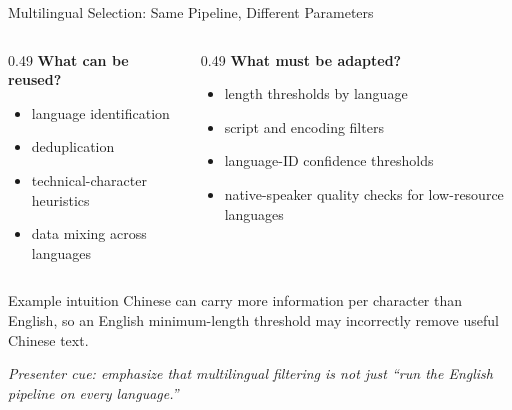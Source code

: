 \documentclass[aspectratio=169]{beamer}
\begin{document}
\begin{frame}{Multilingual Selection: Same Pipeline, Different Parameters}

\begin{columns}[T,totalwidth=\textwidth]

\begin{column}{0.49\textwidth}
\textbf{What can be reused?}
\begin{itemize}
  \item language identification
  \item deduplication
  \item technical-character heuristics
  \item data mixing across languages
\end{itemize}
\end{column}

\begin{column}{0.49\textwidth}
\textbf{What must be adapted?}
\begin{itemize}
  \item length thresholds by language
  \item script and encoding filters
  \item language-ID confidence thresholds
  \item native-speaker quality checks for low-resource languages
\end{itemize}
\end{column}

\end{columns}

\vspace{0.8em}

\begin{block}{Example intuition}
Chinese can carry more information per character than English, so an English minimum-length threshold may incorrectly remove useful Chinese text.
\end{block}

\vspace{0.3em}
\footnotesize\textit{Presenter cue: emphasize that multilingual filtering is not just ``run the English pipeline on every language.''}

\end{frame}
\end{document}
